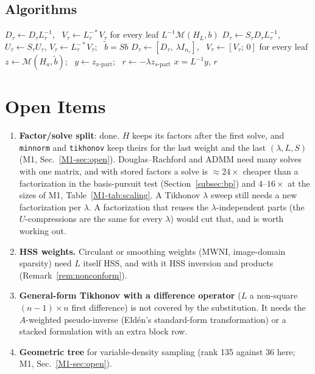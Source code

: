 \documentclass[11pt]{article}
\theoremstyle{remark}
\begin{document}
\subsection{Algorithms}
\begin{algorithm}[!htb]
\caption{Weighted minimum norm and Tikhonov through $\mathcal M$}
\label{alg:WT}
\begin{algorithmic}[1]
  \State $D_\tau\gets D_\tau L_\tau^{-1}$, \ $V_\tau\gets L_\tau^{-*}V_\tau$ for every leaf 
  \State \Return $L^{-1}\mathcal M(H_L,b)$
\EndFunction
{}
  \State $D_\tau\gets S_\tau D_\tau L_\tau^{-1}$, $U_\tau\gets S_\tau U_\tau$, $V_\tau\gets L_\tau^{-*}V_\tau$; \ $\tilde b=Sb$ 
  \State $D_\tau\gets[D_\tau,\ \lambda I_{n_\tau}]$, \ $V_\tau\gets[V_\tau;\,0]$ for every leaf 
  \State $z\gets\mathcal M(H_a,\tilde b)$; \ $y\gets z_{x\text{-part}}$; \ $r\gets-\lambda z_{s\text{-part}}$ 
  \State \Return $x=L^{-1}y$, $r$
\EndFunction
\end{algorithmic}
\end{algorithm}



\section{Open Items}\label{sec:open2}
\begin{enumerate}[leftmargin=1.5em,itemsep=2pt]
\item \textbf{Factor/solve split}: done. $H$ keeps its factors after the first solve, and \texttt{minnorm} and
\texttt{tikhonov} keep theirs for the last weight and the last $(\lambda,L,S)$ (M1, Sec.~\ref{M1-sec:open}). Douglas--Rachford
and ADMM need many solves with one matrix, and with stored factors a solve is $\approx24\times$ cheaper than
a factorization in the basis-pursuit test (Section~\ref{subsec:bp}) and $4$--$16\times$ at the sizes of M1,
Table~\ref{M1-tab:scaling}. A Tikhonov $\lambda$ sweep still needs a new factorization per $\lambda$.
A factorization that reuses the $\lambda$-independent parts (the $U$-compressions are the same
for every $\lambda$) would cut that, and is worth working out.
\item \textbf{HSS weights.} Circulant or smoothing weights (MWNI, image-domain sparsity) need $L$ itself
HSS, and with it HSS inversion and products (Remark~\ref{rem:nonconform}).
\item \textbf{General-form Tikhonov with a difference operator} ($L$ a non-square
$(n-1)\times n$ first difference) is not covered by the substitution. It needs the
$A$-weighted pseudo-inverse (Eld\'en's standard-form transformation) or a stacked formulation
with an extra block row.
\item \textbf{Geometric tree} for variable-density sampling (rank 135 against 36 here; M1,
Sec.~\ref{M1-sec:open}).
\end{enumerate}
\end{document}
